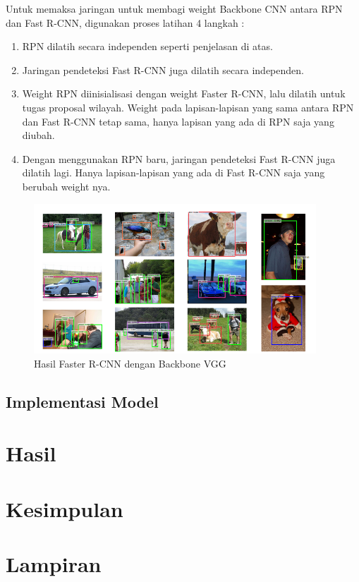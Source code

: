 \documentclass{article}
\begin{document}
   	\par Untuk memaksa jaringan untuk membagi weight Backbone CNN antara RPN dan Fast R-CNN, digunakan proses latihan 4 langkah :
   	\begin{enumerate}
   		\item RPN dilatih secara independen seperti penjelasan di atas.
   		\item Jaringan pendeteksi Fast R-CNN juga dilatih secara independen.
   		\item Weight RPN diinisialisasi dengan weight Faster R-CNN, lalu dilatih untuk tugas proposal wilayah. Weight pada lapisan-lapisan yang sama antara RPN dan Fast R-CNN tetap sama, hanya lapisan yang ada di RPN saja yang diubah.
   		\item Dengan menggunakan RPN baru, jaringan pendeteksi Fast R-CNN juga dilatih lagi. Hanya lapisan-lapisan yang ada di Fast R-CNN saja yang berubah weight nya. 
   	\end{enumerate}
   	
   	\begin{figure}[H]
   		\centering
   		\includegraphics[width=400px]{arsitektur/contoh_hasil.png}
   		\caption{Hasil Faster R-CNN dengan Backbone VGG}
   	\end{figure}
   	
  	\subsection{Implementasi Model}
  \section{Hasil}
  \section{Kesimpulan}
  \section{Lampiran}
  \newpage
  \printbibliography[title={Referensi}]
\end{document}
